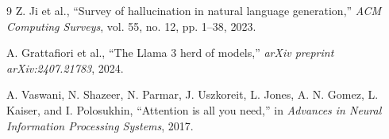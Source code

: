 \documentclass[10pt,twocolumn,a4paper]{article}
\begin{document}
\begin{thebibliography}{9}
		Z. Ji et al.,
		``Survey of hallucination in natural language generation,''
		\textit{ACM Computing Surveys}, vol. 55, no. 12, pp. 1--38, 2023.

		A. Grattafiori et al.,
		``The Llama 3 herd of models,''
		\textit{arXiv preprint arXiv:2407.21783}, 2024.

		A. Vaswani, N. Shazeer, N. Parmar, J. Uszkoreit, L. Jones, A. N. Gomez, L. Kaiser, and I. Polosukhin,
		``Attention is all you need,''
		in \textit{Advances in Neural Information Processing Systems},
		2017.

	\end{thebibliography}
\end{document}
